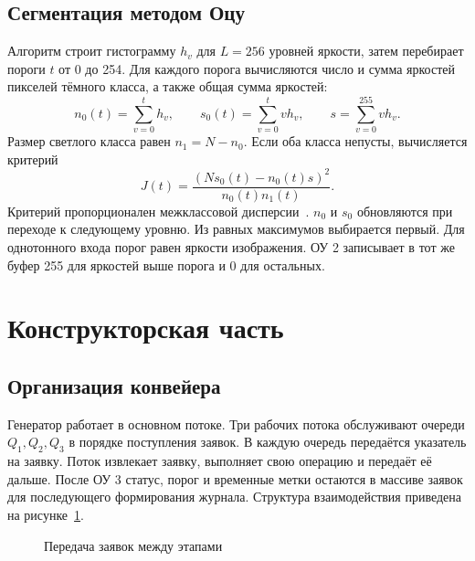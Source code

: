 \subsection{Сегментация методом Оцу}
Алгоритм строит гистограмму \(h_v\) для \(L=256\) уровней яркости, затем перебирает пороги \(t\) от 0 до 254. Для каждого порога вычисляются число и сумма яркостей пикселей тёмного класса, а также общая сумма яркостей:
\begin{equation}
  n_0(t)=\sum_{v=0}^{t}h_v,\qquad
  s_0(t)=\sum_{v=0}^{t}v h_v,\qquad
  s=\sum_{v=0}^{255}v h_v .
\end{equation}
Размер светлого класса равен \(n_1=N-n_0\). Если оба класса непусты, вычисляется критерий
\begin{equation}
  J(t)=\frac{(N s_0(t)-n_0(t)s)^2}{n_0(t)n_1(t)} .
\end{equation}
Критерий пропорционален межклассовой дисперсии~\cite{otsu}. \(n_0\) и \(s_0\) обновляются при переходе к следующему уровню. Из равных максимумов выбирается первый. Для однотонного входа порог равен яркости изображения. ОУ 2 записывает в тот же буфер 255 для яркостей выше порога и 0 для остальных.

\clearpage\section{Конструкторская часть}
\subsection{Организация конвейера}
Генератор работает в основном потоке. Три рабочих потока обслуживают очереди \(Q_1,Q_2,Q_3\) в порядке поступления заявок. В каждую очередь передаётся указатель на заявку. Поток извлекает заявку, выполняет свою операцию и передаёт её дальше. После ОУ 3 статус, порог и временные метки остаются в массиве заявок для последующего формирования журнала. Структура взаимодействия приведена на рисунке~\ref{fig:structure}.

\begin{figure}[H]\centering
{}
\caption{Передача заявок между этапами}\label{fig:structure}
\end{figure}

